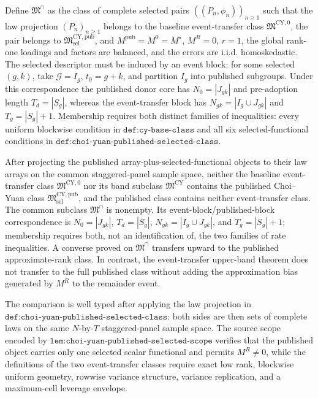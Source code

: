 Define \(\mathfrak M^\cap\) as the class of complete selected pairs
\(((P_n,\phi_n))_{n\ge1}\) such that the law projection
\((P_n)_{n\ge1}\) belongs to the baseline event-transfer class
\(\mathfrak M^{\mathrm{CY},0}\), the pair belongs to
\(\mathfrak M^{\mathrm{CY,pub}}_{\mathrm{sel}}\), and
\(M^{\mathrm{pub}}=M^0=M^\star\), \(M^R=0\), \(r=1\), the global
rank-one loadings and factors are
balanced, and the errors are i.i.d. homoskedastic.  The selected
descriptor must be induced by an event block: for some selected
\((g,k)\), take \(\mathcal G=I_g\), \(t_0=g+k\), and partition
\(I_g\) into published subgroups.  Under this correspondence the
published donor core has \(N_0=|J_{gk}|\) and pre-adoption length
\(T_d=|S_g|\), whereas the event-transfer block has
\(N_{gk}=|I_g\cup J_{gk}|\) and \(T_g=|S_g|+1\).  Membership requires
both distinct families of inequalities: every uniform blockwise
condition in \(\texttt{def:cy-base-class}\) and all six selected-functional
conditions in \(\texttt{def:choi-yuan-published-selected-class}\).

After projecting the published array-plus-selected-functional objects to
their law arrays on the common staggered-panel sample space, neither the
baseline event-transfer class \(\mathfrak M^{\mathrm{CY},0}\) nor its band
subclass \(\mathfrak M^{\mathrm{CY}}\) contains the published Choi--Yuan
class \(\mathfrak M^{\mathrm{CY,pub}}_{\mathrm{sel}}\), and the published
class contains neither event-transfer class.  The common subclass
\(\mathfrak M^\cap\) is nonempty.  Its event-block/published-block
correspondence is
\(N_0=|J_{gk}|\), \(T_d=|S_g|\),
\(N_{gk}=|I_g\cup J_{gk}|\), and \(T_g=|S_g|+1\); membership requires
both, not an identification of, the two families of rate inequalities.
A converse proved on \(\mathfrak M^\cap\) transfers upward to the
published approximate-rank class.  In contrast, the event-transfer
upper-band theorem does not transfer to the full published class without
adding the approximation bias generated by \(M^R\) to the remainder
event.

The comparison is well typed after applying the law projection in
\(\texttt{def:choi-yuan-published-selected-class}\): both sides are then
sets of complete laws on the same \(N\)-by-\(T\) staggered-panel sample
space.  The source scope encoded by
\(\texttt{lem:choi-yuan-published-selected-scope}\) verifies that the
published object carries only one selected scalar functional and permits
\(M^R\ne0\), while the definitions of the two event-transfer classes
require exact low rank, blockwise uniform geometry, rowwise variance
structure, variance replication, and a maximum-cell leverage envelope.

